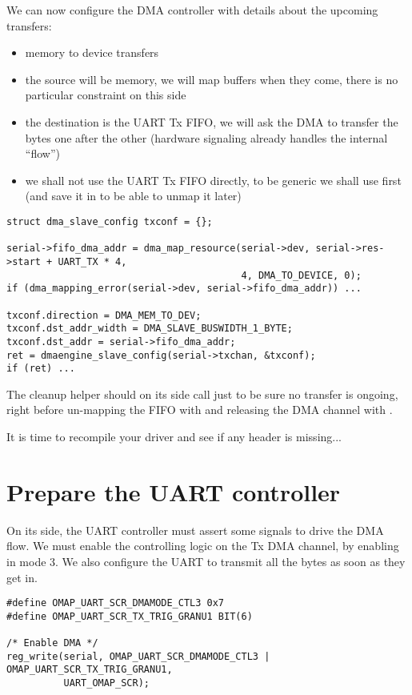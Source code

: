 We can now configure the DMA controller with details about the upcoming
transfers:
\begin{itemize}
\item memory to device transfers
\item the source will be memory, we will map buffers when they come,
  there is no particular constraint on this side
\item the destination is the UART Tx FIFO, we will ask the DMA to
  transfer the bytes one after the other (hardware signaling already
  handles the internal ``flow'')
\item we shall not use the UART Tx FIFO directly, to be generic we shall use
   first (and save it in  to be able
  to unmap it later)
\end{itemize}

\begin{verbatim}
struct dma_slave_config txconf = {};

serial->fifo_dma_addr = dma_map_resource(serial->dev, serial->res->start + UART_TX * 4,
                                         4, DMA_TO_DEVICE, 0);
if (dma_mapping_error(serial->dev, serial->fifo_dma_addr)) ...

txconf.direction = DMA_MEM_TO_DEV;
txconf.dst_addr_width = DMA_SLAVE_BUSWIDTH_1_BYTE;
txconf.dst_addr = serial->fifo_dma_addr;
ret = dmaengine_slave_config(serial->txchan, &txconf);
if (ret) ...
\end{verbatim}

The cleanup helper should on its side call
 just to be sure no transfer is
ongoing, right before un-mapping the FIFO with  and
releasing the DMA channel with .

It is time to recompile your driver and see if any header is missing...

\section{Prepare the UART controller}

On its side, the UART controller must assert some signals to drive the DMA
flow. We must enable the controlling logic on the Tx DMA channel, by enabling
 in mode 3. We also configure the UART to transmit all the bytes
as soon as they get in.

\begin{verbatim}
#define OMAP_UART_SCR_DMAMODE_CTL3 0x7
#define OMAP_UART_SCR_TX_TRIG_GRANU1 BIT(6)

/* Enable DMA */
reg_write(serial, OMAP_UART_SCR_DMAMODE_CTL3 | OMAP_UART_SCR_TX_TRIG_GRANU1,
          UART_OMAP_SCR);
\end{verbatim}

